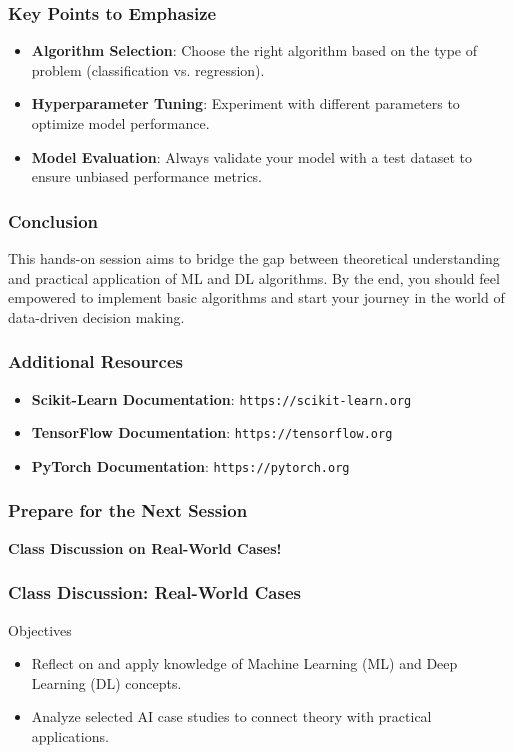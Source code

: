 \documentclass[aspectratio=169]{beamer}
\begin{document}
\begin{frame}[fragile]
    \frametitle{Key Points to Emphasize}
    \begin{itemize}
        \item \textbf{Algorithm Selection}: Choose the right algorithm based on the type of problem (classification vs. regression).
        \item \textbf{Hyperparameter Tuning}: Experiment with different parameters to optimize model performance.
        \item \textbf{Model Evaluation}: Always validate your model with a test dataset to ensure unbiased performance metrics.
    \end{itemize}
\end{frame}

\begin{frame}[fragile]
    \frametitle{Conclusion}
    This hands-on session aims to bridge the gap between theoretical understanding and practical application of ML and DL algorithms. By the end, you should feel empowered to implement basic algorithms and start your journey in the world of data-driven decision making.
\end{frame}

\begin{frame}[fragile]
    \frametitle{Additional Resources}
    \begin{itemize}
        \item \textbf{Scikit-Learn Documentation}: \texttt{https://scikit-learn.org}
        \item \textbf{TensorFlow Documentation}: \texttt{https://tensorflow.org}
        \item \textbf{PyTorch Documentation}: \texttt{https://pytorch.org}
    \end{itemize}
\end{frame}

\begin{frame}[fragile]
    \frametitle{Prepare for the Next Session}
    \textbf{Class Discussion on Real-World Cases!}
\end{frame}

\begin{frame}[fragile]
    \frametitle{Class Discussion: Real-World Cases}
    
    \begin{block}{Objectives}
        \begin{itemize}
            \item Reflect on and apply knowledge of Machine Learning (ML) and Deep Learning (DL) concepts.
            \item Analyze selected AI case studies to connect theory with practical applications.
        \end{itemize}
    \end{block}
\end{frame}
\end{document}
